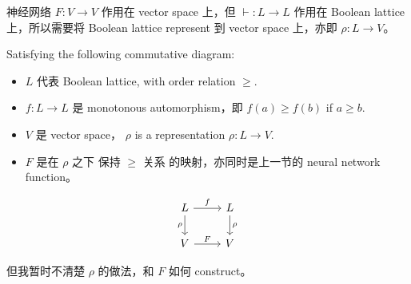 \documentclass[orivec]{llncs}
\begin{document}
神经网络 $F: V \rightarrow V$ 作用在 vector space 上，但 $\vdash: L \rightarrow L$ 作用在 Boolean lattice 上，所以需要将 Boolean lattice represent 到 vector space 上，亦即 $\rho: L \rightarrow V$。 

Satisfying the following commutative diagram:
\begin{itemize}
	\item $L$ 代表 Boolean lattice, with order relation $\ge$.
	
	\item $f: L \rightarrow L$ 是 monotonous automorphism，即 $f(a) \ge f(b)$ if $a \ge b$.
	
	\item $V$ 是 vector space， $\rho$ is a representation $\rho: L \rightarrow V$.
	
	\item $F$ 是在 $\rho$ 之下 保持 $\ge$ 关系 的映射，亦同时是上一节的 neural network function。
\end{itemize}
\begin{equation}
\begin{tikzcd}
L \arrow{r}{f} \arrow[swap]{d}{\rho} & L \arrow{d}{\rho} \\
V \arrow{r}{F} & V
\end{tikzcd}
\end{equation}

但我暂时不清楚 $\rho$ 的做法，和 $F$ 如何 construct。


\end{document}
